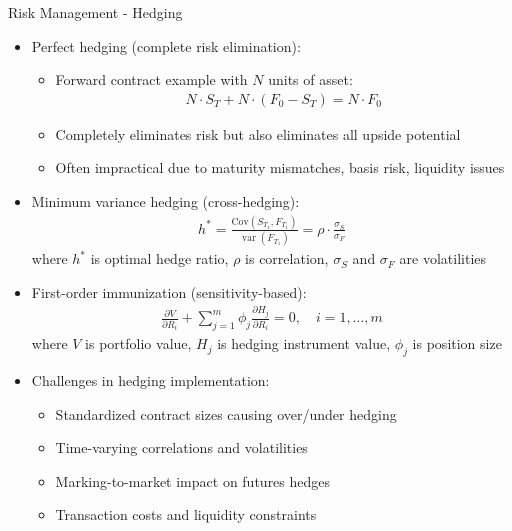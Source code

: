\documentclass[10pt]{beamer}
\DeclareMathOperator\var{var}
\begin{document}
\begin{frame}{Risk Management - Hedging}
  \begin{itemize}[<+->]
    \item Perfect hedging (complete risk elimination):
      \begin{itemize}
        \item Forward contract example with $N$ units of asset:
          \begin{align*}
            N \cdot S_T + N \cdot (F_0 - S_T) = N \cdot F_0
          \end{align*}
        \item Completely eliminates risk but also eliminates all upside potential
        \item Often impractical due to maturity mismatches, basis risk, liquidity issues
      \end{itemize}
      
    \item Minimum variance hedging (cross-hedging):
      \begin{align*}
        h^* = \tfrac{\text{Cov}(S_{T_1}, F_{T_1})}{\var(F_{T_1})} = \rho \cdot \tfrac{\sigma_S}{\sigma_F}
      \end{align*}
      where $h^*$ is optimal hedge ratio, $\rho$ is correlation, $\sigma_S$ and $\sigma_F$ are volatilities
      
    \item First-order immunization (sensitivity-based):
      \begin{align*}
        \tfrac{\partial V}{\partial R_i} + \sum_{j=1}^m \phi_j \tfrac{\partial H_j}{\partial R_i} = 0, \quad i = 1, \ldots, m
      \end{align*}
      where $V$ is portfolio value, $H_j$ is hedging instrument value, $\phi_j$ is position size
      
    \item Challenges in hedging implementation:
      \begin{itemize}
        \item Standardized contract sizes causing over/under hedging
        \item Time-varying correlations and volatilities
        \item Marking-to-market impact on futures hedges
        \item Transaction costs and liquidity constraints
      \end{itemize}
  \end{itemize}
\end{frame}
\end{document}
